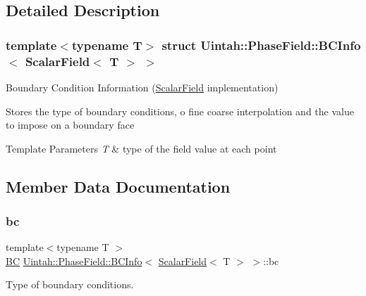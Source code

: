 \subsection{Detailed Description}
\subsubsection*{template$<$typename T$>$\newline
struct Uintah\+::\+Phase\+Field\+::\+B\+C\+Info$<$ Scalar\+Field$<$ T $>$ $>$}

Boundary Condition Information (\hyperlink{structUintah_1_1PhaseField_1_1ScalarField}{Scalar\+Field} implementation) 

Stores the type of boundary conditions, o fine coarse interpolation and the value to impose on a boundary face


\begin{DoxyTemplParams}{Template Parameters}
{\em T} & type of the field value at each point \\
\hline
\end{DoxyTemplParams}


\subsection{Member Data Documentation}
\mbox{\label{structUintah_1_1PhaseField_1_1BCInfo_3_01ScalarField_3_01T_01_4_01_4_ae9766432d25bb51969514416b541ba2c}} 
\subsubsection{\texorpdfstring{bc}{bc}}
{\footnotesize\ttfamily template$<$typename T $>$ \\
\hyperlink{namespaceUintah_1_1PhaseField_a148fba372aa3be96fd6eede7a2fa10b5}{BC} \hyperlink{structUintah_1_1PhaseField_1_1BCInfo}{Uintah\+::\+Phase\+Field\+::\+B\+C\+Info}$<$ \hyperlink{structUintah_1_1PhaseField_1_1ScalarField}{Scalar\+Field}$<$ T $>$ $>$\+::bc}



Type of boundary conditions. 

